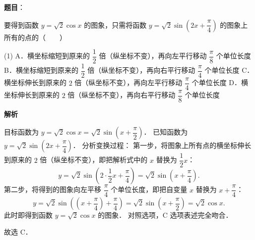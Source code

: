 \begin{answer}

\textbf{题目}：

要得到函数 $y = \sqrt{2} \cos x$ 的图象，只需将函数 $y = \sqrt{2} \sin\left(2x + \dfrac{\pi}{4}\right)$ 的图象上所有的点的\mbox{（　　）}

\begin{gkopts}(1)
\task A．横坐标缩短到原来的 $\dfrac{1}{2}$ 倍（纵坐标不变），再向左平行移动 $\dfrac{\pi}{8}$ 个单位长度
\task B．横坐标缩短到原来的 $\dfrac{1}{2}$ 倍（纵坐标不变），再向右平行移动 $\dfrac{\pi}{4}$ 个单位长度
\task C．横坐标伸长到原来的 $2$ 倍（纵坐标不变），再向左平行移动 $\dfrac{\pi}{4}$ 个单位长度
\task D．横坐标伸长到原来的 $2$ 倍（纵坐标不变），再向右平行移动 $\dfrac{\pi}{8}$ 个单位长度
\end{gkopts}

\textbf{解析}

目标函数为 $y = \sqrt{2} \cos x = \sqrt{2} \sin\left(x + \dfrac{\pi}{2}\right)$．
已知函数为 $y = \sqrt{2} \sin\left(2x + \dfrac{\pi}{4}\right)$．
分析变换过程：
第一步，将图象上所有点的横坐标伸长到原来的 $2$ 倍（纵坐标不变），即把解析式中的 $x$ 替换为 $\dfrac{1}{2}x$：
\nopagebreak[4]
\[
y = \sqrt{2} \sin\left(2 \cdot \dfrac{1}{2}x + \dfrac{\pi}{4}\right) = \sqrt{2} \sin\left(x + \dfrac{\pi}{4}\right).
\]
第二步，将得到的图象向左平移 $\dfrac{\pi}{4}$ 个单位长度，即把自变量 $x$ 替换为 $x + \dfrac{\pi}{4}$：
\nopagebreak[4]
\[
y = \sqrt{2} \sin\left(\left(x + \dfrac{\pi}{4}\right) + \dfrac{\pi}{4}\right) = \sqrt{2} \sin\left(x + \dfrac{\pi}{2}\right) = \sqrt{2} \cos x.
\]
此时即得到函数 $y = \sqrt{2}\cos x$ 的图象．
对照选项，C 选项表述完全吻合．

故选 C．


\end{answer}
